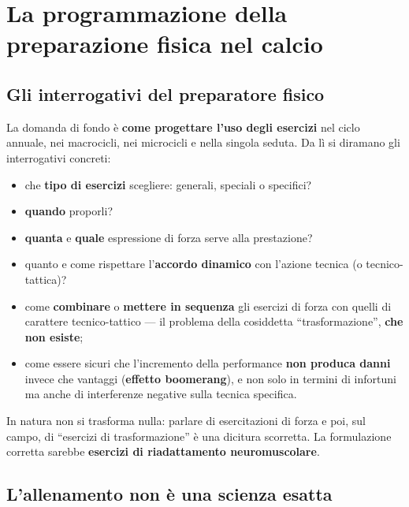 \chapter{La programmazione della preparazione fisica nel calcio}

\section{Gli interrogativi del preparatore fisico}

La domanda di fondo è \textbf{come progettare l'uso degli esercizi} nel ciclo annuale, nei
macrocicli, nei microcicli e nella singola seduta. Da lì si diramano gli interrogativi concreti:

\begin{itemize}
  \item che \textbf{tipo di esercizi} scegliere: generali, speciali o specifici?
  \item \textbf{quando} proporli?
  \item \textbf{quanta} e \textbf{quale} espressione di forza serve alla prestazione?
  \item quanto e come rispettare l'\textbf{accordo dinamico} con l'azione tecnica (o
    tecnico-tattica)?
  \item come \textbf{combinare} o \textbf{mettere in sequenza} gli esercizi di forza con quelli di
    carattere tecnico-tattico --- il problema della cosiddetta ``trasformazione'', \textbf{che non
    esiste};
  \item come essere sicuri che l'incremento della performance \textbf{non produca danni} invece che
    vantaggi (\textbf{effetto boomerang}), e non solo in termini di infortuni ma anche di
    interferenze negative sulla tecnica specifica.
\end{itemize}

In natura non si trasforma nulla: parlare di esercitazioni di forza e poi, sul campo, di
``esercizi di trasformazione'' è una dicitura scorretta. La formulazione corretta sarebbe
\textbf{esercizi di riadattamento neuromuscolare}.

\section{L'allenamento non è una scienza esatta}

